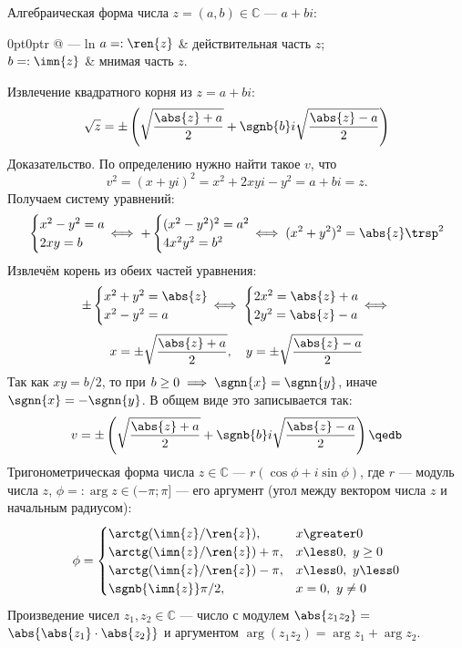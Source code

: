 Алгебраическая форма числа $z=(a,b)\in\mathbb{C}$ --- $a+bi$:

\begin{tabularc}{0pt}{0pt}{r @{ --- } l}{n}
$a=:\ren{z}$ & действительная часть $z$;\\
$b=:\imn{z}$ & мнимая часть $z$.
\end{tabularc}
Извлечение квадратного корня из $z=a+bi$:
$$\sqrt{z}=\pm\left(\sqrt{\frac{\abs{z}+a}{2}}+\sgnb{b}i\sqrt{\frac{\abs{z}-a}{2}}\right)
$$
{\bold Доказательство.} По определению нужно найти такое $v$, что
$$v^2=(x+yi)^2=x^2+2xyi-y^2=a+bi=z.$$
Получаем систему уравнений:
$$\begin{cases}
x^2-y^2=a\\
2xy=b
\end{cases}\hspace*{-12pt}\iff
+\begin{cases}
(x^2-y^2)^2=a^2\\
4x^2y^2=b^2
\end{cases}\hspace*{-12pt}\iff
(x^2+y^2)^2=\abs{z}\trsp^2$$
Извлечём корень из обеих частей уравнения:
$$\pm\begin{cases}
x^2+y^2=\abs{z}\\
x^2-y^2=a
\end{cases}\hspace*{-12pt}\iff
\begin{cases}
2x^2=\abs{z}+a\\
2y^2=\abs{z}-a
\end{cases}\hspace*{-12pt}\iff$$
$$x=\pm\sqrt{\frac{\abs{z}+a}{2}},\quad y=\pm\sqrt{\frac{\abs{z}-a}{2}}$$
Так как $xy=b/2$, то при $b\geq 0\implies\sgnn{x}=\sgnn{y}$, иначе
$\sgnn{x}=-\sgnn{y}$. В общем виде это записывается так:
$$v=\pm\left(\sqrt{\frac{\abs{z}+a}{2}}+\sgnb{b}i\sqrt{\frac{\abs{z}-a}{2}}\right)\qedb$$
Тригонометрическая форма числа $z\in\mathbb{C}$ --- $r(\cos\phi+i\sin\phi)$, где $r$ --- 
модуль числа $z$, $\phi=:\arg z\in(-\pi;\pi]$ --- его аргумент {\ital (угол между 
вектором числа $z$ и начальным радиусом)}:
$$\phi=\begin{cases}
\arctg(\imn{z}/\ren{z}), &x\greater 0\\
\arctg(\imn{z}/\ren{z})+\pi, &x\less 0,\ y\geq 0\\
\arctg(\imn{z}/\ren{z})-\pi, &x\less 0,\ y\less 0\\
\sgnb{\imn{z}}\pi/2, &x=0,\ y\neq 0
\end{cases}$$
Произведение чисел $z_1,z_2\in\mathbb{C}$ --- число с модулем $\abs{z_1z_2}=$
$\abs{\abs{z_1}\cdot\abs{z_2}}$ и аргументом $\arg(z_1z_2)=\arg z_1+\arg z_2$.

